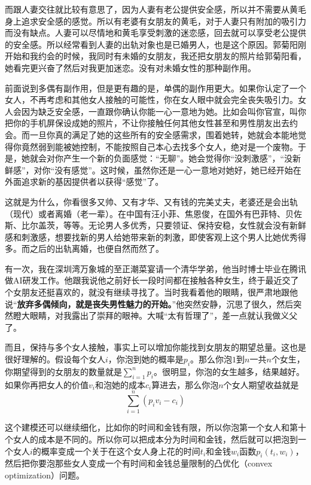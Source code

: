 而跟人妻交往就比较有意思了，因为人妻有老公提供安全感，所以并不需要从黄毛身上追求安全感的感觉。所以有老婆有女朋友的黄毛，对于人妻只有附加的吸引力而没有缺点。人妻可以尽情地和黄毛享受刺激的迷恋感，回去就可以享受老公提供的安全感。所以经常看到人妻的出轨对象也是已婚男人，也是这个原因。郭菊阳刚开始和我约会的时候，我同时有未婚的女朋友，我还把女朋友的照片给郭菊阳看，她看完更兴奋了然后对我更加迷恋。没有对未婚女性的那种副作用。

前面说到多偶有副作用，但是更有趣的是，单偶的副作用更大。如果你认定了一个女人，不再考虑和其他女人接触的可能性，你在女人眼中就会完全丧失吸引力。女人会因为缺乏安全感，一直跟你确认你能一心一意地为她。比如会叫你官宣，叫你把你的手机屏保设成她的照片，不让你接触任何其他女性甚至和男性朋友出去约会。而一旦你真的满足了她的这些所有的安全感需求，围着她转，她就会本能地觉得你竟然弱到能被她控制，不能按照自己本心去找多个女人，绝对是一个废物。于是，她就会对你产生一个新的负面感觉：``无聊''。她会觉得你``没刺激感''，``没新鲜感''，对你``没有感觉''。这时候，虽然你还是一心一意地对她好，她已经开始在外面追求新的基因提供者以获得``感觉''了。

这就是为什么，你看很多又帅、又有才华、又有钱的完美丈夫，老婆还是会出轨（现代）或者离婚（老一辈）。在中国有汪小菲、焦恩俊，在国外有巴菲特、贝佐斯、比尔盖茨，等等。无论男人多优秀，只要领证、保持安稳，女性就会没有新鲜感和刺激感，想要找新的男人给她带来新的刺激，即使客观上这个男人比她优秀得多。而之后的出轨离婚，也便自然而然了。

有一次，我在深圳湾万象城的至正潮菜宴请一个清华学弟，他当时博士毕业在腾讯做AI研发工作。他跟我说他之前好长一段时间都在接触各种女生，终于最近交了个女朋友还挺喜欢的，就没有继续寻找了。当时我看着他的眼睛，很严肃地跟他说``\textbf{放弃多偶倾向，就是丧失男性魅力的开始。}''他突然安静，沉思了很久，然后突然瞪大眼睛，对我露出了崇拜的眼神。大喊``太有哲理了''，差一点就认我做义父了。

而且，保持与多个女人接触，事实上可以增加你能找到女朋友的期望总量。这也是很好理解的。假设每个女人$i$，你泡到她的概率是$p_i$。那么你泡$1$到$n$一共$n$个女生，你期望得到的女朋友的数量就是$\sum_{i=1}^n p_i$。很明显，你泡的女生越多，结果越好。如果你再把女人的价值$v_i$和泡她的成本$c_i$算进去，那么你泡$n$个女人期望收益就是
$$\sum_{i=1}^n \left(p_i v_i - c_i\right)$$

这个建模还可以继续细化，比如你的时间和金钱有限，所以你泡第一个女人和第十个女人的成本是不同的。所以你可以把成本分为时间和金钱，然后就可以把泡到一个女人$i$的概率变成一个关于在这个女人身上花的时间$t_i$和金钱$w_i$函数$p_i(t_i, w_i)$，然后把你要泡那些女人变成一个有时间和金钱总量限制的凸优化（convex optimization）问题。

